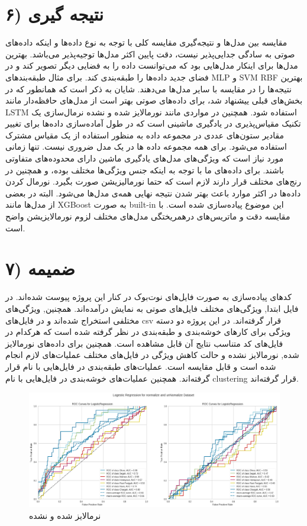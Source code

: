 \documentclass{article}
\begin{document}
\section{۶) نتیجه گیری}
مقایسه بین مدل‌ها و نتیجه‌گیری\newline
مقایسه کلی \newline
با توجه به نوع داده‌ها و اینکه داده‌های صوتی به سادگی جدایی‌پذیر نیست، دقت پایین اکثر مدل‌ها توجیه‌پذیر می‌باشد. بهترین مدل‌ها برای اینکار مدل‌هایی بود که می‌توانست داده را به فضایی دیگر تصویر کند و در فضای جدید داده‌ها را طبقه‌بندی کند. برای مثال طبقه‌بندهای MLP و SVM RBF بهترین نتیجه‌ها را در مقایسه با سایر مدل‌ها می‌دهند. شایان به ذکر است که همانطور که در بخش‌های قبلی ییشنهاد شد، برای داده‌های صوتی بهتر است از مدل‌های حافظه‌دار مانند LSTM استفاده شود. همچنین در مواردی مانند  
نورمالایز شده و نشده\newline
نرمال‌سازی یک تکنیک مقیاس‌پذیری در یادگیری ماشینی است که در طول آماده‌سازی داده‌ها برای تغییر مقادیر ستون‌های عددی در مجموعه داده به منظور استفاده از یک مقیاس مشترک استفاده می‌شود. برای همه مجموعه داده ها در یک مدل ضروری نیست. تنها زمانی مورد نیاز است که ویژگی‌های مدل‌های یادگیری ماشین دارای محدوده‌های متفاوتی باشند. برای داده‌های ما با توجه به اینکه جنس ویژگی‌ها مختلف بوده، و همچنین در رنج‌های مختلف قرار دارند لازم است که حتما نورمالیزیشن صورت بگیرد.\newline
نورمال کردن داده‌ها در اکثر موارد باعث بهتر شدن نتیجه نهایی همه‌ی مدل‌ها می‌شود. البته در بعضی از مدل‌ها مانند XGBoost به صورت built-in این موضوع پیاده‌سازی شده است. با مقایسه دقت و ماتریس‌های درهمریختگی مدل‌های مختلف لزوم نورمالایزیشن واضح است.\newline


\section{۷)  ضمیمه}
کد‌های ‌پیاده‌سازی به صورت فایل‌های نوت‌بوک در کنار این پروژه پیوست شده‌اند. در فایل  ابتدا, ویژگی‌های مختلف فایل‌های صوتی به نمایش درآمده‌اند. همچنین, ویژگی‌های مختلفی استخراج شده‌اند و در فایل‌های csv قرار گرفته‌اند. در این پروژه دو دسته ویژگی برای کارهای خوشه‌بندی و طبقه‌بندی در نظر گرفته شده است که هرکدام در فایل‌های کد متناسب نتایج آن قابل مشاهده است. \newline
همچنین برای داده‌های نورمالایز شده, نورمالایز نشده و حالت کاهش ویژگی در فایل‌های مختلف عملیات‌های لازم انجام شده‌ است و قابل مقایسه است.
عملیات‌های طبقه‌بندی در فایل‌هایی با نام  قرار گرفته‌اند. همچنین عملیات‌های خوشه‌بندی در فایل‌هایی با نام clustering قرار گرفته‌اند.
\begin{figure}[h]
	\centering
	\includegraphics[width=0.7\linewidth]{Photo/f1}
	\caption[نرمالایز شده و نشده]{نرمالایز شده و نشده}
	\label{fig:f1}
\end{figure}
\end{document}
